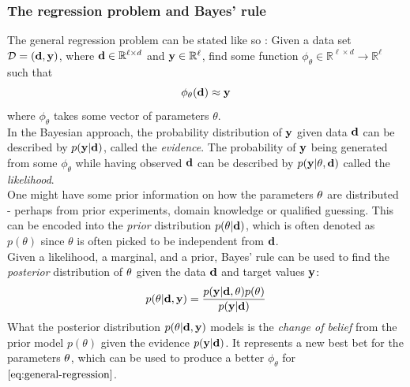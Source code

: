 \subsubsection{The regression problem and Bayes' rule}
The general regression problem can be stated like so \cite{krause22}:
Given a data set $\mathcal{D} = (\mathbf{d}, \mathbf{y})$, where $\mathbf{d}\in \mathbb{R}^{\ell \times d}$ and $\mathbf{y} \in \mathbb{R}^{\ell}$,  find some function $\phi_\theta \in \mathbb{R}^{\ell \times d} \rightarrow \mathbb{R}^{\ell}$ such that
\begin{equation}
  \label{eq:general-regression}
\phi_\theta(\mathbf{d}) \approx \mathbf{y}
\end{equation}
where $\phi_\theta$ takes some vector of parameters $\theta$.\\
In the Bayesian approach, the probability distribution of $\mathbf{y}$ given data $\mathbf{d}$ can be described by $p(\mathbf{y} | \mathbf{d})$, called the \textit{evidence}.
The probability of $\mathbf{y}$ being generated from some $\phi_\theta$ while having observed $\mathbf{d}$ can be described by $p(\mathbf{y}|\theta, \mathbf{d})$
called the \textit{likelihood}.\\
One might have some prior information on how the parameters $\mathbf{\theta}$ are distributed - perhaps from prior experiments, domain knowledge or qualified guessing. This can be encoded into the \textit{prior} distribution $p(\mathbf{\theta}|\mathbf{d})$, which is often denoted as $p(\theta)$ since $\theta$ is often picked to be independent from $\mathbf{d}$.\\
Given a likelihood, a marginal, and a prior, 
Bayes' rule can be used to find the \textit{posterior} distribution of $\mathbf{\theta}$ given the data $\mathbf{d}$ and target values $\mathbf{y}$:
\begin{equation}
  \label{eq:bayes-rule}
  p(\mathbf{\theta} | \mathbf{d}, \mathbf{y}) = \frac{p(\mathbf{y} | \mathbf{d}, \mathbf{\theta})p(\mathbf{\theta})}{p(\mathbf{y| \mathbf{d}})}
\end{equation}
What the posterior distribution $p(\mathbf{\theta} | \mathbf{d}, \mathbf{y})$ models is the \textit{change of belief} from the prior model $p(\theta)$ given the evidence $p(\mathbf{y} | \mathbf{d})$\cite{krause22}.
It represents a new best bet for the parameters $\mathbf{\theta}$, which can be used to produce a better $\phi_\theta$ for $\eqref{eq:general-regression}$.
